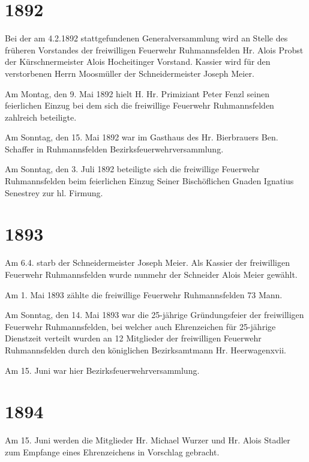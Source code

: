 \documentclass[12pt,a4paper]{book}
\begin{document}
\section*{1892}

Bei der am 4.2.1892 stattgefundenen Generalversammlung wird an Stelle des
früheren Vorstandes der freiwilligen Feuerwehr Ruhmannsfelden Hr. Alois Probst
der Kürschnermeister Alois Hocheitinger Vorstand. Kassier wird für den
verstorbenen Herrn Moosmüller der Schneidermeister Joseph Meier.

Am Montag, den 9. Mai 1892 hielt H. Hr. Primiziant Peter Fenzl seinen
feierlichen Einzug bei dem sich die freiwillige Feuerwehr Ruhmannsfelden
zahlreich beteiligte.

Am Sonntag, den 15. Mai 1892 war im Gasthaus des Hr. Bierbrauers Ben. Schaffer
in Ruhmannsfelden Bezirksfeuerwehrversammlung.

Am Sonntag, den 3. Juli 1892 beteiligte sich die freiwillige Feuerwehr
Ruhmannsfelden beim feierlichen Einzug Seiner Bischöflichen Gnaden Ignatius
Senestrey zur hl. Firmung.

\section*{1893}

Am 6.4. starb der Schneidermeister Joseph Meier. Als Kassier der freiwilligen
Feuerwehr Ruhmannsfelden wurde nunmehr der Schneider Alois Meier gewählt.

Am 1. Mai 1893 zählte die freiwillige Feuerwehr Ruhmannsfelden 73 Mann.

Am Sonntag, den 14. Mai 1893 war die 25-jährige Gründungsfeier der freiwilligen
Feuerwehr Ruhmannsfelden, bei welcher auch Ehrenzeichen für 25-jährige
Dienstzeit verteilt wurden an 12 Mitglieder der freiwilligen Feuerwehr
Ruhmannsfelden durch den königlichen Bezirksamtmann Hr. Heerwagenxvii.

Am 15. Juni war hier Bezirksfeuerwehrversammlung.

\section*{1894}

Am 15. Juni werden die Mitglieder Hr. Michael Wurzer und Hr. Alois Stadler zum
Empfange eines Ehrenzeichens in Vorschlag gebracht.
\end{document}
